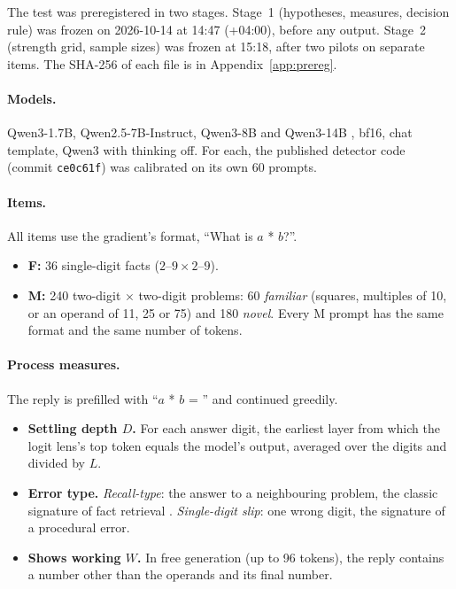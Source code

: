 \documentclass[11pt]{article}
\begin{document}
The test was preregistered in two stages. Stage~1 (hypotheses, measures, decision rule) was frozen on 2026-10-14 at 14:47 (+04:00), before any output. Stage~2 (strength grid, sample sizes) was frozen at 15:18, after two pilots on separate items. The SHA-256 of each file is in Appendix~\ref{app:prereg}.

\paragraph{Models.} Qwen3-1.7B, Qwen2.5-7B-Instruct, Qwen3-8B and Qwen3-14B \citep{qwen3,qwen25}, bf16, chat template, Qwen3 with thinking off. For each, the published detector code (commit \texttt{ce0c61f}) was calibrated on its own 60 prompts.

\paragraph{Items.} All items use the gradient's format, ``What is $a$ * $b$?''.
\begin{itemize}
  \item \textbf{F:} 36 single-digit facts ($2$--$9 \times 2$--$9$).
  \item \textbf{M:} 240 two-digit $\times$ two-digit problems: 60 \emph{familiar} (squares, multiples of 10, or an operand of 11, 25 or 75) and 180 \emph{novel}. Every M prompt has the same format and the same number of tokens.
\end{itemize}

\paragraph{Process measures.} The reply is prefilled with ``$a$ * $b$ = '' and continued greedily.
\begin{itemize}
  \item \textbf{Settling depth $D$.} For each answer digit, the earliest layer from which the logit lens's top token equals the model's output, averaged over the digits and divided by $L$.
  \item \textbf{Error type.} \emph{Recall-type}: the answer to a neighbouring problem, the classic signature of fact retrieval \citep{campbell1985mental}. \emph{Single-digit slip}: one wrong digit, the signature of a procedural error.
  \item \textbf{Shows working $W$.} In free generation (up to 96 tokens), the reply contains a number other than the operands and its final number.
\end{itemize}
\end{document}
